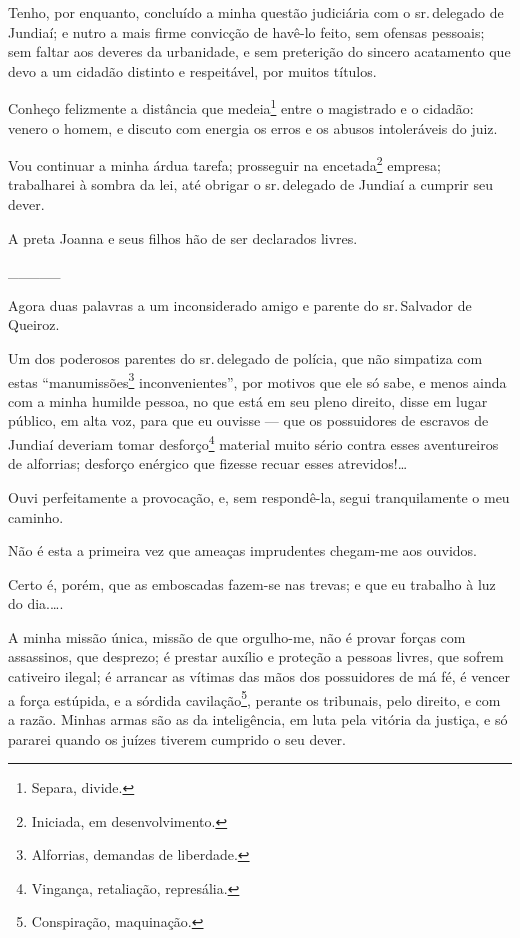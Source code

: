 \asterisc{}

Tenho, por enquanto, concluído a minha questão judiciária com o sr.\,delegado de Jundiaí; e nutro a mais firme convicção de havê-lo feito,
sem ofensas pessoais; sem faltar aos deveres da urbanidade, e sem
preterição do sincero acatamento que devo a um cidadão distinto e
respeitável, por muitos títulos.

Conheço felizmente a distância que medeia\footnote{ Separa, divide.}
entre o magistrado e o cidadão: venero o homem, e discuto com energia os
erros e os abusos intoleráveis do juiz.

Vou continuar a minha árdua tarefa; prosseguir na encetada\footnote{
  Iniciada, em desenvolvimento.} empresa; trabalharei à sombra da lei,
até obrigar o sr.\,delegado de Jundiaí a cumprir seu dever.

A preta Joanna e seus filhos hão de ser declarados livres.

\_\_\_\_\_

Agora duas palavras a um inconsiderado amigo e parente do sr.\,Salvador
de Queiroz.

Um dos poderosos parentes do sr.\,delegado de polícia, que não simpatiza
com estas ``manumissões\footnote{ Alforrias, demandas de liberdade.}
inconvenientes'', por motivos que ele só sabe, e menos ainda com a minha
humilde pessoa, no que está em seu pleno direito, disse em lugar
público, em alta voz, para que eu ouvisse --- que os possuidores de
escravos de Jundiaí deveriam tomar desforço\footnote{ Vingança,
  retaliação, represália.} material muito sério contra esses
aventureiros de alforrias; desforço enérgico que fizesse recuar esses
atrevidos!\ldots{}

Ouvi perfeitamente a provocação, e, sem respondê-la, segui
tranquilamente o meu caminho.

Não é esta a primeira vez que ameaças imprudentes chegam-me aos
ouvidos.

Certo é, porém, que as emboscadas fazem-se nas trevas; e que eu trabalho
à luz do dia.\ldots.

A minha missão única, missão de que orgulho-me, não é provar forças com
assassinos, que desprezo; é prestar auxílio e proteção a pessoas livres,
que sofrem cativeiro ilegal; é arrancar as vítimas das mãos dos
possuidores de má fé, é vencer a força estúpida, e a sórdida
cavilação\footnote{ Conspiração, maquinação.}, perante os tribunais,
pelo direito, e com a razão. Minhas armas são as da inteligência, em
luta pela vitória da justiça, e só pararei quando os juízes tiverem
cumprido o seu dever.

